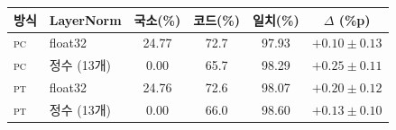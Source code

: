 \setlength{\tabcolsep}{4pt}
\begin{tabular}{llcccc}
\toprule
방식 & LayerNorm & 국소(\%) & 코드(\%) & 일치(\%) & $\Delta$ (\%p) \\
\midrule
\textsc{pc} & float32 & 24.77 & 72.7 & 97.93 & $+0.10\pm0.13$ \\
\textsc{pc} & 정수 (13개) & 0.00 & 65.7 & 98.29 & $+0.25\pm0.11$ \\
\textsc{pt} & float32 & 24.76 & 72.6 & 98.07 & $+0.20\pm0.12$ \\
\textsc{pt} & 정수 (13개) & 0.00 & 66.0 & 98.60 & $+0.13\pm0.10$ \\
\bottomrule
\end{tabular}
